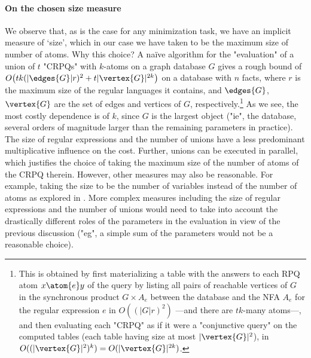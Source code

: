 \paragraph{On the chosen size measure}
  We observe that, as is the case for any minimization task, we have an implicit measure of `size', which in our case we have taken to be the maximum size of number of atoms.
  Why this choice?
  A na\"ive algorithm for the "evaluation" of a union of $t$ "CRPQs" with $k$-atoms on a graph database $G$ gives a rough bound of $O\big(t  k  (|\edges{G}|  r)^2 + t  |\vertex{G}|^{2k}\big)$ on a database with $n$ facts, where $r$ is the maximum size of the regular languages it contains, and $\edges{G}$, $\vertex{G}$ are the set of edges and vertices of $G$, respectively.\footnote{This is obtained by first materializing a table with the answers to each RPQ atom $x \atom{e} y$ of the query by listing all pairs of reachable vertices of $G$ in the synchronous product $G \times A_e$ between the database and the NFA $A_e$ for the regular expression $e$ in $O((|G|r)^2)$ ---and there are $tk$-many atoms---, and then evaluating each "CRPQ" as if it were a "conjunctive query" on the computed tables (each table having size at most $|\vertex{G}|^2$), in $O((|\vertex{G}|^2)^k) = O(|\vertex{G}|^{2k})$.}
  As we see, the most costly dependence is of $k$, since $G$ is the largest object ("ie", the database, several orders of magnitude larger than the remaining parameters in practice). The size of regular expressions and the number of unions have a less predominant multiplicative influence on the cost.
  Further, unions can be executed in parallel, which justifies the choice of taking the maximum size of the number of atoms of the CRPQ therein.
  However, other measures may also be reasonable. For example, taking the size to be the number of variables instead of the number of atoms as explored in .
  More complex measures including the size of regular expressions and the number of unions would need to take into account the drastically different roles of the parameters in the evaluation in view of the previous discussion ("eg", a simple sum of the parameters would not be a reasonable choice).



